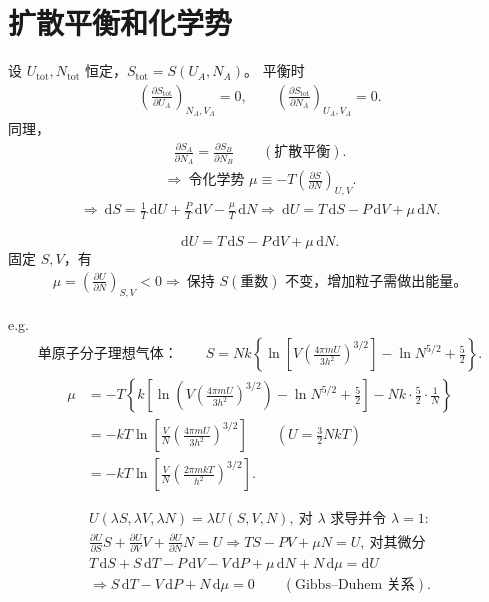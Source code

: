 \section{扩散平衡和化学势}
设 $U_{\mathrm{tot}},N_{\mathrm{tot}}$ 恒定，$S_{\mathrm{tot}}=S(U_A,N_A)$。
平衡时
\begin{align}
\left(\frac{\partial S_{\mathrm{tot}}}{\partial U_A}\right)_{N_A,V_A}=0,
\qquad
\left(\frac{\partial S_{\mathrm{tot}}}{\partial N_A}\right)_{U_A,V_A}=0.
\end{align}
同理，
\begin{align}
\frac{\partial S_A}{\partial N_A}=\frac{\partial S_B}{\partial N_B}\qquad (\text{扩散平衡}).
\end{align}
\begin{align}
\Rightarrow\ \text{令化学势 }\mu\equiv -T\left(\frac{\partial S}{\partial N}\right)_{U,V}.
\end{align}
\begin{align}
\Rightarrow\ \mathrm{d}S=\frac{1}{T}\,\mathrm{d}U+\frac{P}{T}\,\mathrm{d}V-\frac{\mu}{T}\,\mathrm{d}N
\Rightarrow\ \mathrm{d}U=T\,\mathrm{d}S-P\,\mathrm{d}V+\mu\,\mathrm{d}N.
\end{align}

\begin{equation}\label{eq:IdentityU}
    \mathrm{d}U=T\,\mathrm{d}S-P\,\mathrm{d}V+\mu\,\mathrm{d}N.
\end{equation}
固定 $S,V$，有
\begin{align}
\mu=\left(\frac{\partial U}{\partial N}\right)_{S,V}<0
\Rightarrow\ \text{保持 }S(\text{重数})\text{ 不变，增加粒子需做出能量。}
\end{align}

e.g.
\begin{align}
\text{单原子分子理想气体：}
\qquad
S=Nk\left\{\ln\left[V\left(\frac{4\pi mU}{3h^2}\right)^{3/2}\right]-\ln N^{5/2}+\frac{5}{2}\right\}.
\end{align}
\begin{align}
\mu
&=-T\left\{k\left[\ln\left(V\left(\frac{4\pi mU}{3h^2}\right)^{3/2}\right)-\ln N^{5/2}+\frac{5}{2}\right]-Nk\cdot\frac{5}{2}\cdot\frac{1}{N}\right\}\\
&=-kT\ln\left[\frac{V}{N}\left(\frac{4\pi mU}{3h^2}\right)^{3/2}\right]\qquad \left(U=\frac{3}{2}NkT\right)\\
&=-kT\ln\left[\frac{V}{N}\left(\frac{2\pi mkT}{h^2}\right)^{3/2}\right].
\end{align}

\begin{align}
U(\lambda S,\lambda V,\lambda N)=\lambda U(S,V,N),\ \text{对 }\lambda\text{ 求导并令 }\lambda=1:\\
\frac{\partial U}{\partial S}S+\frac{\partial U}{\partial V}V+\frac{\partial U}{\partial N}N=U
\Rightarrow TS-PV+\mu N=U,\ \text{对其微分}\\
T\,\mathrm{d}S+S\,\mathrm{d}T-P\,\mathrm{d}V-V\,\mathrm{d}P+\mu\,\mathrm{d}N+N\,\mathrm{d}\mu=\mathrm{d}U\\
\Rightarrow S\,\mathrm{d}T-V\,\mathrm{d}P+N\,\mathrm{d}\mu=0\qquad (\text{Gibbs--Duhem 关系}).
\end{align}
